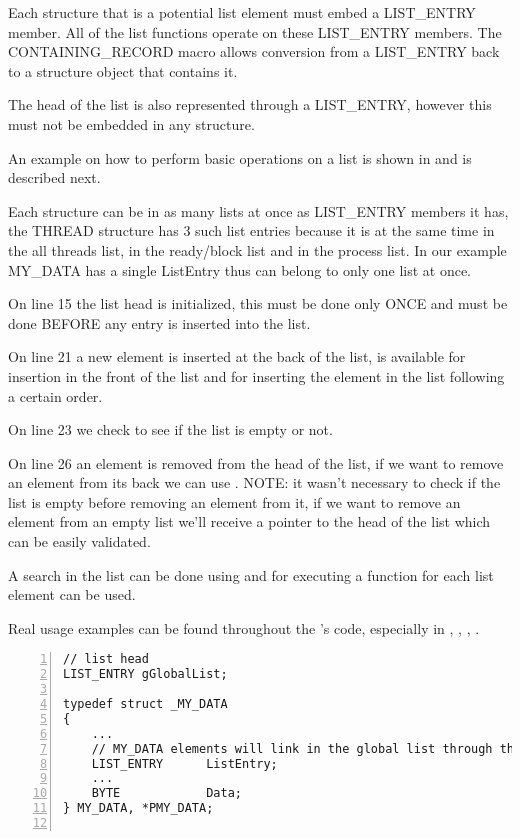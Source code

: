 \begin{appendices}
Each structure that is a potential list element must embed a LIST\_ENTRY member. All of the list
functions operate on these LIST\_ENTRY members. The CONTAINING\_RECORD macro allows conversion from
a LIST\_ENTRY back to a structure object that contains it.

The head of the list is also represented through a LIST\_ENTRY, however this must not be embedded in
any structure.

An example on how to perform basic operations on a list is shown in  and is
described next.

Each structure can be in as many lists at once as LIST\_ENTRY members it has, the THREAD structure
has 3 such list entries because it is at the same time in the all threads list, in the ready/block
list and in the process list. In our example MY\_DATA has a single ListEntry thus can belong to
only one list at once.

On line 15 the list head is initialized, this must be done only ONCE and must be done BEFORE any
entry is inserted into the list.

On line 21 a new element is inserted at the back of the list,  is available for
insertion in the front of the list and  for inserting the element in the
list following a certain order.

On line 23 we check to see if the list is empty or not.

On line 26 an element is removed from the head of the list, if we want to remove an element from its
back we can use . NOTE: it wasn't necessary to check if the list is empty
before removing an element from it, if we want to remove an element from an empty list we'll
receive a pointer to the head of the list which can be easily validated.

A search in the list can be done using  and for executing a function for
each list element  can be used.

Real usage examples can be found throughout the \projectname's code, especially in ,
, , .

\begin{lstlisting}[caption={List Usage Example},label={lst:ListExample},numbers=left]
// list head
LIST_ENTRY gGlobalList;

typedef struct _MY_DATA
{
	...
	// MY_DATA elements will link in the global list through the ListEntry field
	LIST_ENTRY		ListEntry;
	...
	BYTE			Data;
} MY_DATA, *PMY_DATA;


\end{lstlisting}
\end{appendices}
